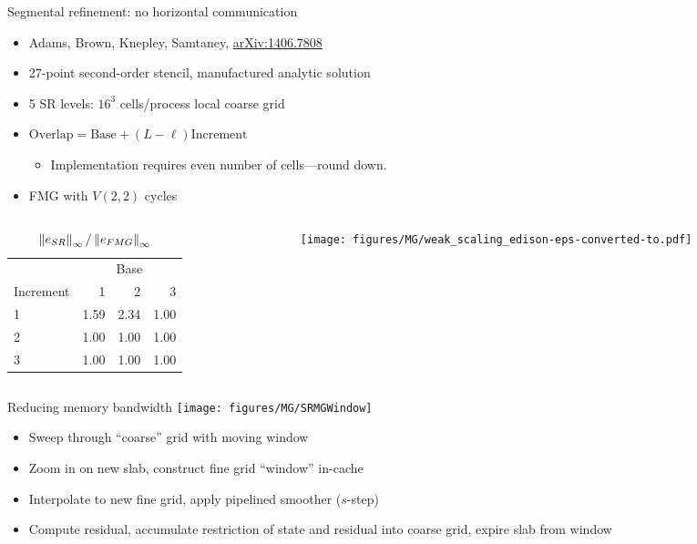 \documentclass{beamer}
\begin{document}
\begin{frame}{Segmental refinement: no horizontal communication}
  \begin{itemize}
  \item Adams, Brown, Knepley, Samtaney, \hyperref{http://arxiv.org/abs/1406.7808}{}{}{arXiv:1406.7808}
  \item 27-point second-order stencil, manufactured analytic solution
  \item 5 SR levels: $16^3$ cells/process local coarse grid
  \item $\text{Overlap} = \text{Base} + (L-\ell) \text{Increment}$
    \begin{itemize}
    \item Implementation requires even number of cells---round down.
    \end{itemize}
  \item FMG with $V(2,2)$ cycles
  \end{itemize}
  \begin{columns}
    \begin{column}{0.4\textwidth}
      \begin{table}\small
        \centering\caption{$\left\lVert e_{SR} \right\rVert_\infty / \left\lVert e_{FMG} \right\rVert_\infty$}\label{tab:sr-error}
        \begin{tabular}{l rrr}
          \toprule
          & \multicolumn{3}{c}{Base} \\
          Increment & 1 & 2 & 3 \\
          \midrule
          1 & {\color{red} 1.59} & {\color{red} 2.34} & 1.00 \\
          2 & 1.00 & 1.00 & 1.00 \\
          3 & 1.00 & 1.00 & 1.00 \\
          \bottomrule
        \end{tabular}
      \end{table}
    \end{column}
    \begin{column}{0.6\textwidth}
      \texttt{[image: figures/MG/weak\_scaling\_edison-eps-converted-to.pdf]}
    \end{column}
  \end{columns}
\end{frame}

\begin{frame}{Reducing memory bandwidth}
  \texttt{[image: figures/MG/SRMGWindow]}
  \begin{itemize}
  \item Sweep through ``coarse'' grid with moving window
  \item Zoom in on new slab, construct fine grid ``window'' in-cache
  \item Interpolate to new fine grid, apply pipelined smoother ($s$-step)
  \item Compute residual, accumulate restriction of state and residual into coarse grid, expire slab from window
  \end{itemize}
\end{frame}
\end{document}
